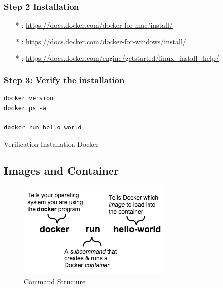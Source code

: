 \documentclass[12pt,a4paper]{article}
\begin{document}
\subsubsection*{Step 2 Installation}

\begin{itemize}
  \item[*] {\color{red}{Mac OS X}}: \url{https://docs.docker.com/docker-for-mac/install/}
  \item[*] {\color{red}{Windows}} : \url{https://docs.docker.com/docker-for-windows/install/}
  \item[*] {\color{red}{Linux}} : \url{https://docs.docker.com/engine/getstarted/linux_install_help/}
\end{itemize}

\subsubsection*{Step 3: Verify the installation}


\begin{listing}[ht]
 \begin{verbatim}
docker version
docker ps -a

docker run hello-world
\end{verbatim}
\label{code:1
}
\caption{Verification Installation Docker}
 \end{listing}
\FloatBarrier


\newpage
\subsection{Images and Container}

\begin{figure}[h]
  \begin{center}
    \includegraphics[scale=0.4]{cmd1.png}
    \caption{Command Structure}
    \label{fig:1}
  \end{center}
\end{figure}
\FloatBarrier
\end{document}
